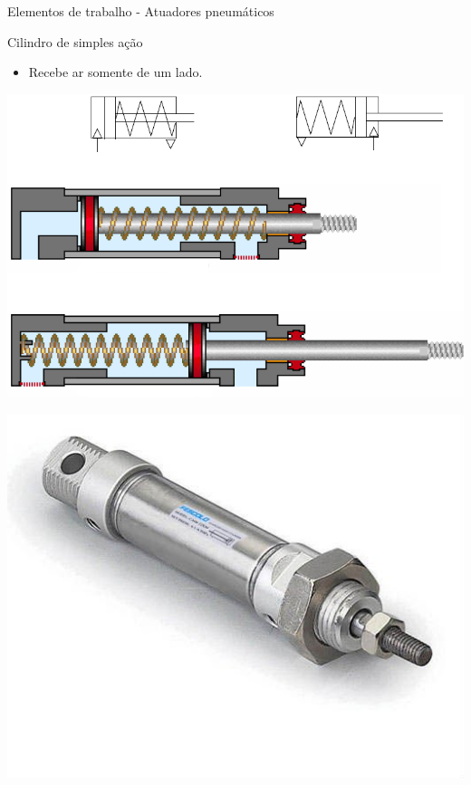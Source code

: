 \begin{frame}{Elementos de trabalho - Atuadores pneumáticos}
	\begin{block}{Cilindro de simples ação}
		\begin{itemize}
			\item Recebe ar somente de um lado.
		\end{itemize}
	\end{block}
	
	\medskip
	
	\begin{minipage}[c]{0.48\linewidth}
		\centering
		\includegraphics[width=1\linewidth]{Figuras/Ch14/fig31}
	\end{minipage}
	\hfill
	\begin{minipage}[c]{0.48\linewidth}
		\centering
		\includegraphics[width=1\linewidth]{Figuras/Ch14/fig32}
	\end{minipage}
	
\end{frame}


